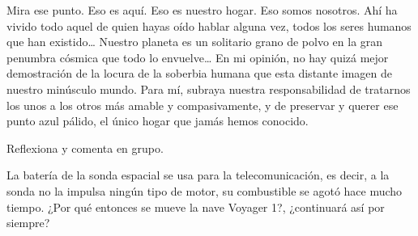 \documentclass[11pt]{book}
\begin{document}
\begin{boxK}
  \begin{boxF}
    Mira ese punto. Eso es aquí. Eso es nuestro hogar. Eso somos nosotros.
    Ahí ha vivido todo aquel de quien hayas oído hablar alguna vez,
    todos los seres humanos que han existido\dots
    Nuestro planeta es un solitario grano de polvo en la gran penumbra
    cósmica que todo lo envuelve\dots
    En mi opinión, no hay quizá mejor demostración
    de la locura de la soberbia humana que esta distante imagen de nuestro minúsculo
    mundo. Para mí, subraya nuestra responsabilidad de tratarnos los unos a los
    otros más amable y compasivamente, y de preservar y querer ese punto azul pálido,
    el único hogar que jamás hemos conocido.
  \end{boxF}

  Reflexiona y comenta en grupo.

  La batería de la sonda espacial se usa para la telecomunicación, es decir, a la sonda no la impulsa ningún tipo de motor, su combustible se agotó hace mucho tiempo. ¿Por qué entonces se mueve la nave Voyager 1?, ¿continuará así por siempre?
\end{boxK}
\end{document}
